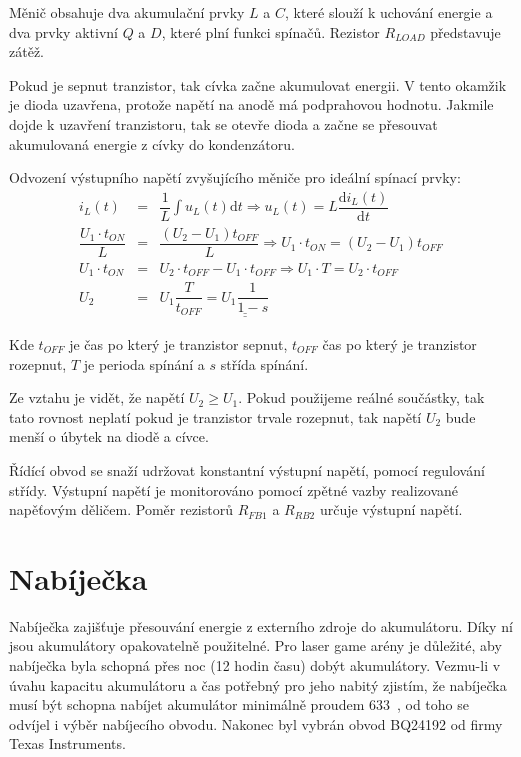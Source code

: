 Měnič obsahuje dva akumulační prvky $L$ a $C$, které slouží k uchování energie a dva prvky aktivní $Q$ a $D$, které plní funkci spínačů. Rezistor $R_{LOAD}$ představuje zátěž.

Pokud je sepnut tranzistor, tak cívka začne akumulovat energii. V tento okamžik je dioda uzavřena, protože napětí na anodě má podprahovou hodnotu. Jakmile dojde k uzavření tranzistoru, tak se otevře dioda a začne se přesouvat akumulovaná energie z cívky do kondenzátoru.

Odvození výstupního napětí zvyšujícího měniče pro ideální spínací prvky:
\begin{eqnarray}
    i_L(t) &=& \dfrac{1}{L} \int u_L(t) \mathrm{d}t \Rightarrow u_L(t) = L \dfrac{\mathrm{d}i_L(t)}{\mathrm{d}t}
    \nonumber\\
    \dfrac{U_1 \cdot t_{ON}}{L} &=& \dfrac{(U_2 - U_1) t_{OFF}}{L} \Rightarrow U_1 \cdot t_{ON} = (U_2 - U_1) t_{OFF}
    \nonumber\\
    U_1 \cdot t_{ON} &=& U_2 \cdot t_{OFF} - U_1 \cdot t_{OFF} \Rightarrow U_1 \cdot T = U_2 \cdot t_{OFF}
    \nonumber\\
    U_2 &=& U_1 \dfrac{T}{t_{OFF}} = \underline{\underline{U_1 \dfrac{1}{1-s}}}
    \nonumber
\end{eqnarray}

Kde $t_{OFF}$ je čas po který je tranzistor sepnut, $t_{OFF}$ čas po který je tranzistor rozepnut, $T$ je perioda spínání a $s$ střída spínání.

Ze vztahu je vidět, že napětí $U_2 \geq U_1$. Pokud použijeme reálné součástky, tak tato rovnost neplatí pokud je tranzistor trvale rozepnut, tak napětí $U_2$ bude menší o úbytek na diodě a cívce.

Řídící obvod se snaží udržovat konstantní výstupní napětí, pomocí regulování střídy. Výstupní napětí je monitorováno pomocí zpětné vazby realizované napěťovým děličem. Poměr rezistorů $R_{FB1}$ a $R_{RB2}$ určuje výstupní napětí.

\section{Nabíječka}
Nabíječka zajišťuje přesouvání energie z externího zdroje do akumulátoru. Díky ní jsou akumulátory opakovatelně použitelné. Pro laser game arény je důležité, aby nabíječka byla schopná přes noc (12 hodin času) dobýt akumulátory. Vezmu-li v úvahu kapacitu akumulátoru a čas potřebný pro jeho nabitý zjistím, že nabíječka musí být schopna nabíjet akumulátor minimálně proudem 633~, od toho se odvíjel i výběr nabíjecího obvodu. Nakonec byl vybrán obvod BQ24192 od firmy Texas Instruments.

